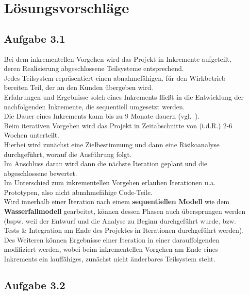 \section{Lösungsvorschläge}

\subsection{Aufgabe 3.1}

Bei dem inkrementellen Vorgehen wird das Projekt in Inkremente aufgeteilt, deren Realisierung abgeschlossene Teilsysteme entsprechend.\\
Jedes Teilsystem repräsentiert einen abnahmefähigen, für den Wirkbetrieb bereiten Teil, der an den Kunden übergeben wird.\\
Erfahrungen und Ergebnisse solch eines Inkrements fließt in die Entwicklung der nachfolgenden Inkremente, die sequentiell umgesetzt werden.\\
Die Dauer eines Inkrements kann bis zu 9 Monate dauern (vgl.~\cite[84]{Wed09}).\\

\noindent
Beim iterativen Vorgehen wird das Projekt in Zeitabschnitte von (i.d.R.) 2-6 Wochen unterteilt.\\
Hierbei wird zunächst eine Zielbestimmung und dann eine Risikoanalyse durchgeführt, worauf die Ausführung folgt.\\
Im Anschluss daran wird dann die nächste Iteration geplant und die abgeschlossene bewertet.\\

\noindent
Im Unterschied zum inkrementellen Vorgehen erlauben Iterationen u.a. Prototypen, also nicht abnahmefähige Code-Teile. \\
Wird innerhalb einer Iteration nach einem \textbf{sequentiellen Modell} wie dem \textbf{Wasserfallmodell} gearbeitet, können dessen Phasen auch übersprungen werden (bspw. weil der Entwurf und die Analyse zu Beginn durchgeführt wurde, bzw. Tests \& Integration am Ende des Projektes in Iterationen durchgeführt werden).\\

\noindent
Des Weiteren können Ergebnisse einer Iteration in einer darauffolgenden modifiziert werden, wobei beim inkrementellen Vorgehen am Ende eines Inkrements ein lauffähiges, zunächst nicht änderbares Teilsystem steht.

\subsection{Aufgabe 3.2}

